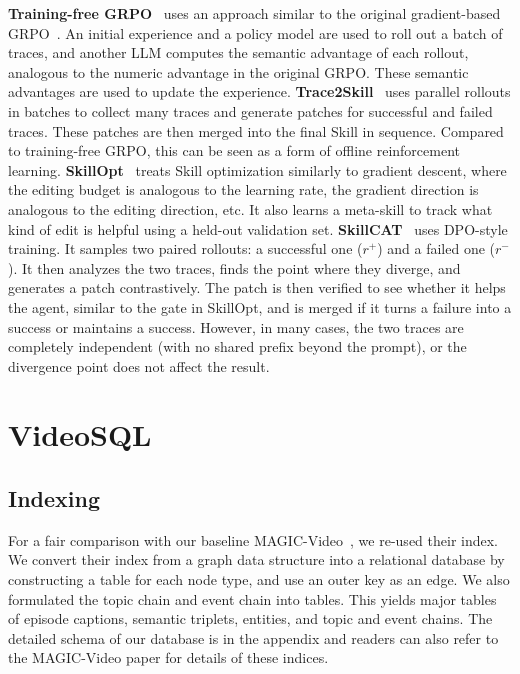 \textbf{Training-free GRPO}~\cite{_251008191_} uses an approach similar to the original gradient-based GRPO~\cite{shao_deepseekmath_2024}. An initial experience and a policy model are used to roll out a batch of traces, and another LLM computes the semantic advantage of each rollout, analogous to the numeric advantage in the original GRPO. These semantic advantages are used to update the experience. \textbf{Trace2Skill}~\cite{ni_trace2skill_2026} uses parallel rollouts in batches to collect many traces and generate patches for successful and failed traces. These patches are then merged into the final Skill in sequence. Compared to training-free GRPO, this can be seen as a form of offline reinforcement learning. \textbf{SkillOpt}~\cite{yang_skillopt_2026} treats Skill optimization similarly to gradient descent, where the editing budget is analogous to the learning rate, the gradient direction is analogous to the editing direction, etc. It also learns a meta-skill to track what kind of edit is helpful using a held-out validation set. \textbf{SkillCAT}~\cite{chen_skillcat_2026} uses DPO-style training. It samples two paired rollouts: a successful one ($r^+$) and a failed one ($r^-$). It then analyzes the two traces, finds the point where they diverge, and generates a patch contrastively. The patch is then verified to see whether it helps the agent, similar to the gate in SkillOpt, and is merged if it turns a failure into a success or maintains a success. However, in many cases, the two traces are completely independent (with no shared prefix beyond the prompt), or the divergence point does not affect the result.


\section{VideoSQL}
\subsection{Indexing}
For a fair comparison with our baseline MAGIC-Video~\cite{li_bridging_2026}, we re-used their index.  We convert their index from a graph data structure into a relational database by constructing a table for each node type, and use an outer key as an edge. We also formulated the topic chain and event chain into tables. This yields major tables of episode captions, semantic triplets, entities, and topic and event chains. The detailed schema of our database is in the appendix and readers can also refer to the MAGIC-Video paper for details of these indices. 

